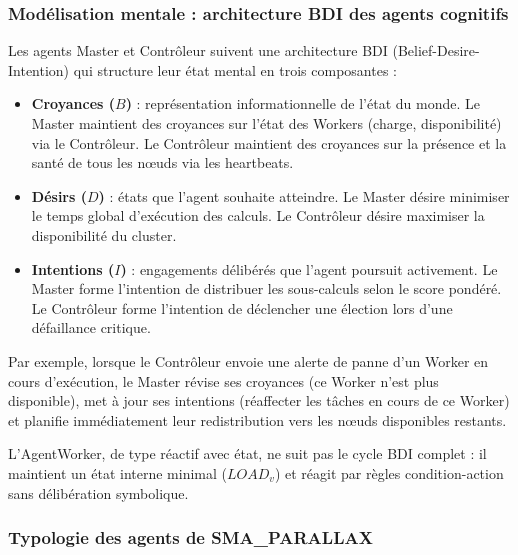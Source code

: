 \documentclass[12pt,a4paper]{report}
\begin{document}
\subsubsection{Modélisation mentale : architecture BDI des agents cognitifs}

Les agents Master et Contrôleur suivent une architecture BDI (Belief-Desire-Intention) qui structure leur état mental en trois composantes \cite{wooldridge} :

\begin{itemize}
    \item \textbf{Croyances ($B$)} : représentation informationnelle de l'état du monde. Le Master maintient des croyances sur l'état des Workers (charge, disponibilité) via le Contrôleur. Le Contrôleur maintient des croyances sur la présence et la santé de tous les nœuds via les heartbeats.
    \item \textbf{Désirs ($D$)} : états que l'agent souhaite atteindre. Le Master désire minimiser le temps global d'exécution des calculs. Le Contrôleur désire maximiser la disponibilité du cluster.
    \item \textbf{Intentions ($I$)} : engagements délibérés que l'agent poursuit activement. Le Master forme l'intention de distribuer les sous-calculs selon le score pondéré. Le Contrôleur forme l'intention de déclencher une élection lors d'une défaillance critique.
\end{itemize}

Par exemple, lorsque le Contrôleur envoie une alerte de panne d'un Worker en cours d'exécution, le Master révise ses croyances (ce Worker n'est plus disponible), met à jour ses intentions (réaffecter les tâches en cours de ce Worker) et planifie immédiatement leur redistribution vers les nœuds disponibles restants.

L'AgentWorker, de type réactif avec état, ne suit pas le cycle BDI complet : il maintient un état interne minimal ($LOAD_v$) et réagit par règles condition-action sans délibération symbolique.

\subsubsection{Typologie des agents de SMA\_PARALLAX}
\end{document}
